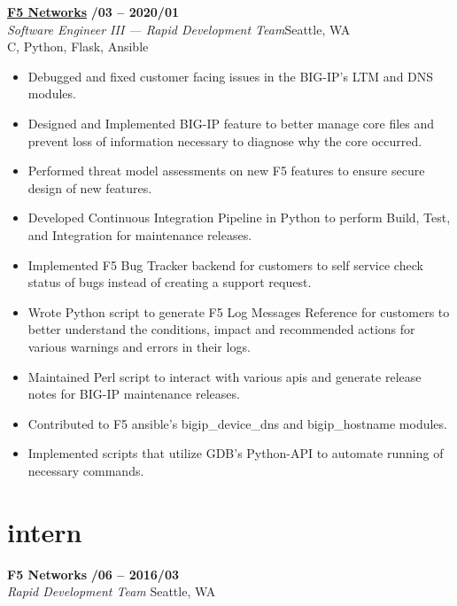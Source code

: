 \documentclass[margin,10pt]{res}
\begin{document}
\begin{resume}
    \href{https://www.f5.com/}{\textbf{F5 Networks}} \hfill \textsc{\bfseries{}/03 -- 2020/01}\\
    \textit{Software Engineer III --- Rapid Development Team}\hfill Seattle, WA\\
    C, Python, Flask, Ansible
    \begin{itemize}
        \item Debugged and fixed customer facing issues in the BIG-IP's LTM and DNS modules.
        \item Designed and Implemented BIG-IP feature to better manage core files and prevent loss of information necessary to
        diagnose why the core occurred.
        \item Performed threat model assessments on new F5 features to ensure secure design of new features.
        \item Developed Continuous Integration Pipeline in Python to perform Build, Test, and Integration for maintenance releases.
        \item Implemented F5 Bug Tracker backend for customers to self service check status of bugs instead of creating a support
        request.
        \item Wrote Python script to generate F5 Log Messages Reference for customers to better understand the conditions, impact
        and recommended actions for various warnings and errors in their logs.
        \item Maintained Perl script to interact with various apis and generate release notes for BIG-IP maintenance releases.
        \item Contributed to F5 ansible's bigip\_device\_dns and bigip\_hostname modules.
        \item Implemented scripts that utilize GDB's Python-API to automate running of necessary commands.
    \end{itemize}
\section{\sc \lsstyle intern}
    \textbf{F5 Networks} \hfill \textsc{\bfseries{}/06 -- 2016/03}\\
    \textit{Rapid Development Team} \hfill Seattle, WA\\


\end{resume}
\end{document}
